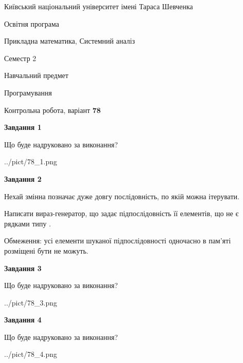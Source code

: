 \documentclass[12pt, ukrainian]{article}
\begin{document}
{{\begin {small}\par
{ \center  Київський національний університет імені Тараса Шевченка \par}
{\parbox {5 cm}{Освітня програма \hfill}{\parbox {8 cm}{Прикладна математика, Системний аналіз \hfill}}\parbox {5 cm}{\hfill Семестр 2}}\par
{\parbox {5 cm} {Навчальний предмет \hfill}\parbox {7 cm}{Програмування \hfill}\parbox {6cm}{\hfill}\par}\vspace{-7pt} \end{small}}{\center Контрольна робота, варіант  \No \textbf
{ 78 }\par}}
{
\begin {large}
{\begin {center}\textbf{Завдання 1}\end {center}}\par
Що буде надруковано за виконання?\par\par
\begin{center}
	{../pict/78_1.png}
\end{center}
\newpage

{\begin {center}\textbf{Завдання 2}\end {center}}\par
Нехай змінна  позначає дуже довгу послідовність, по якій можна ітерувати.

Написати вираз-генератор, що задає підпослідовність її елементів, що не є рядками типу .

Обмеження: усі елементи шуканої підпослідовності одночасно в пам'яті розміщені бути не можуть.\par
\newpage

{\begin {center}\textbf{Завдання 3}\end {center}}\par
Що буде надруковано за виконання?
\begin{center}
	{../pict/78_3.png}
\end{center}
\newpage

{\begin {center}\textbf{Завдання 4}\end {center}}\par
Що буде надруковано за виконання?\par
\begin{center}
	{../pict/78_4.png}
\end{center}
\newpage


\end{large}}
\end{document}
